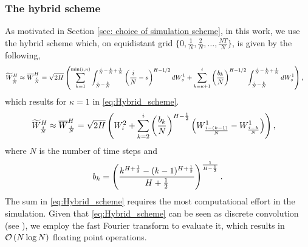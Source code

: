 \subsubsection{The hybrid scheme}\label{sec: The hybrid scheme}
As motivated in Section  \ref{sec: choice of simulation scheme}, in this work, we use the hybrid scheme which,  on equidistant grid $\{0,\frac{1}{N},\frac{2}{N},\dots,\frac{NT}{N}\}$, is given by 
the following,
\begin{align}\label{eq:Hybrid_scheme_pre}
\widetilde{W}^H_{\frac{i}{N}} \approx \overline{W}^H_{\frac{i}{N}}&= \sqrt{2H} \left(  \sum_{k=1}^{\min(i,\kappa)} \int_{\frac{i}{N}-\frac{k}{N}}^{\frac{i}{N}-\frac{k}{N}+\frac{1}{N}} \left(\frac{i}{N}-s\right)^{H - 1/2} dW^1_s+\sum_{k=\kappa+1}^{i} \left(\frac{b_k}{N}\right)^{H - 1/2}  \int_{\frac{i}{N}-\frac{k}{N}}^{\frac{i}{N}-\frac{k}{N}+\frac{1}{N}} dW^1_s \right) ,
\end{align}
which results for $\kappa=1$  in \eqref{eq:Hybrid_scheme}.
\begin{align}\label{eq:Hybrid_scheme}
\widetilde{W}^H_{\frac{i}{N}} \approx \overline{W}^H_{\frac{i}{N}}&= \sqrt{2H} \left(  W^2_i+\sum_{k=2}^{i} \left(\frac{b_k}{N}\right)^{H-\frac{1}{2}} \left(W_{\frac{i-(k-1)}{N}}^1-W_{\frac{i-k}{N}}^1\right)\right),
\end{align}
where $N$ is the number of time steps and 
$$ b_k=\left(\frac{k^{H+\frac{1}{2}}-(k-1)^{H+\frac{1}{2} }}{H+\frac{1}{2}}\right)^{\frac{1}{H-\frac{1}{2}}} .$$
The sum in \eqref{eq:Hybrid_scheme} requires the most computational effort in the simulation. Given that \eqref{eq:Hybrid_scheme} can be seen as discrete convolution  (see \cite{bennedsen2017hybrid}), we employ the fast Fourier transform to evaluate it, which results in  ${\mathcal{O}}\left(N \log N\right)$ floating point operations.

